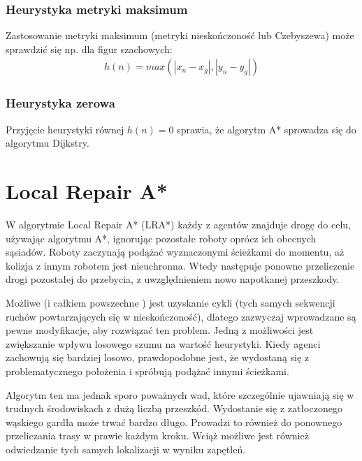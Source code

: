 \subsubsection{Heurystyka metryki maksimum}
Zastosowanie metryki maksimum (metryki nieskończoność lub Czebyszewa) może sprawdzić się np. dla figur szachowych:
\begin{gather}
 	h(n) = max(|x_n - x_g|, |y_n - y_g|)
 	\label{eq_astar_heu_czeb} 
\end{gather}


\subsubsection{Heurystyka zerowa}
Przyjęcie heurystyki równej $h(n) = 0$ sprawia, że algorytm A* sprowadza się do algorytmu Dijkstry.

\section{Local Repair A*}
\label{ch:lra}
W algorytmie Local Repair A* (LRA*) każdy z agentów znajduje drogę do celu, używając algorytmu A*, ignorując pozostałe roboty oprócz ich obecnych sąsiadów. Roboty zaczynają podążać wyznaczonymi ścieżkami do momentu, aż kolizja z innym robotem jest nieuchronna. Wtedy następuje ponowne przeliczenie drogi pozostałej do przebycia, z uwzględnieniem nowo napotkanej przeszkody.

Możliwe (i całkiem powszechne \cite{cooppath}) jest uzyskanie cykli (tych samych sekwencji ruchów powtarzających się w nieskończoność), dlatego zazwyczaj wprowadzane są pewne modyfikacje, aby rozwiązać ten problem. Jedną z możliwości jest zwiększanie wpływu losowego szumu na wartość heurystyki. Kiedy agenci zachowują się bardziej losowo, prawdopodobne jest, że wydostaną się z problematycznego położenia i spróbują podążać innymi ścieżkami.

Algorytm ten ma jednak sporo poważnych wad, które szczególnie ujawniają się w trudnych środowiskach z dużą liczbą przeszkód. Wydostanie się z zatłoczonego wąskiego gardła może trwać bardzo długo. Prowadzi to również do ponownego przeliczania trasy w prawie każdym kroku. Wciąż możliwe jest również odwiedzanie tych samych lokalizacji w wyniku zapętleń.

